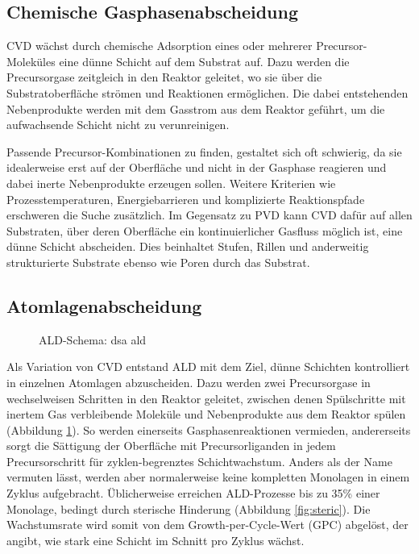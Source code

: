 \subsection{Chemische Gasphasenabscheidung}

CVD wächst durch chemische Adsorption eines oder mehrerer Precursor-Moleküles eine dünne Schicht auf dem Substrat auf.
Dazu werden die Precursorgase zeitgleich in den Reaktor geleitet, wo sie über die Substratoberfläche strömen und Reaktionen ermöglichen.
Die dabei entstehenden Nebenprodukte werden mit dem Gasstrom aus dem Reaktor geführt, um die aufwachsende Schicht nicht zu verunreinigen.

Passende Precursor-Kombinationen zu finden, gestaltet sich oft schwierig, da sie idealerweise erst auf der Oberfläche und nicht in der Gasphase reagieren und dabei inerte Nebenprodukte erzeugen sollen.
Weitere Kriterien wie Prozesstemperaturen, Energiebarrieren und komplizierte Reaktionspfade erschweren die Suche zusätzlich.
Im Gegensatz zu PVD kann CVD dafür auf allen Substraten, über deren Oberfläche ein kontinuierlicher Gasfluss möglich ist, eine dünne Schicht abscheiden.
Dies beinhaltet Stufen, Rillen und anderweitig strukturierte Substrate ebenso wie Poren durch das Substrat.


\subsection{Atomlagenabscheidung}

\begin{figure}
  \centering
  \def\svgwidth{\textwidth}
  
  \caption[ALD-Schema]{ALD-Schema: dsa ald}
  \label{fig:ald-schema}
\end{figure}

Als Variation von CVD entstand ALD  mit dem Ziel, dünne Schichten kontrolliert in einzelnen Atomlagen abzuscheiden.
Dazu werden zwei Precursorgase in wechselweisen Schritten in den Reaktor geleitet, zwischen denen Spülschritte mit inertem Gas verbleibende Moleküle und Nebenprodukte aus dem Reaktor spülen (Abbildung \ref{fig:ald-schema}).
So werden einerseits Gasphasenreaktionen vermieden, andererseits sorgt die Sättigung  der Oberfläche mit Precursorliganden in jedem Precursorschritt für zyklen-begrenztes Schichtwachstum.
Anders als der Name vermuten lässt, werden aber normalerweise keine kompletten Monolagen in einem Zyklus aufgebracht.
Üblicherweise erreichen ALD-Prozesse bis zu 35\%  einer Monolage, bedingt durch sterische Hinderung (Abbildung \ref{fig:steric}).
Die Wachstumsrate wird somit von dem Growth-per-Cycle-Wert (GPC) abgelöst, der angibt, wie stark eine Schicht im Schnitt pro Zyklus wächst.


